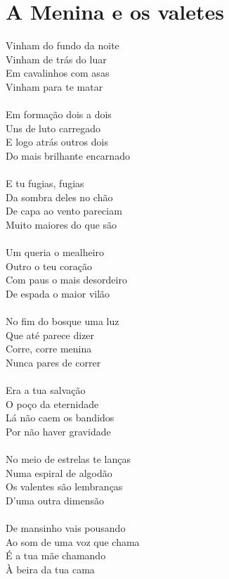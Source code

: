 \documentclass{article}
\begin{document}
\section{ A Menina e os valetes}
Vinham do fundo da noite\\
Vinham de trás do luar\\
Em cavalinhos com asas\\
Vinham para te matar\\
\\
Em formação dois a dois\\
Uns de luto carregado\\
E logo atrás outros dois\\
Do mais brilhante encarnado\\
\\
E tu fugias, fugias\\
Da sombra deles no chão\\
De capa ao vento pareciam\\
Muito maiores do que são\\
\\
Um queria o mealheiro\\
Outro o teu coração\\
Com paus o mais desordeiro\\
De espada o maior vilão\\
\\
No fim do bosque uma luz\\
Que até parece dizer\\
Corre, corre menina\\
Nunca pares de correr\\
\\
Era a tua salvação\\
O poço da eternidade\\
Lá não caem os bandidos\\
Por não haver gravidade\\
\\
No meio de estrelas te lanças\\
Numa espiral de algodão\\
Os valentes são lembranças\\
D'uma outra dimensão\\
\\
De mansinho vais pousando\\
Ao som de uma voz que chama\\
É a tua mãe chamando\\
À beira da tua cama\\
\\
\end{document}

